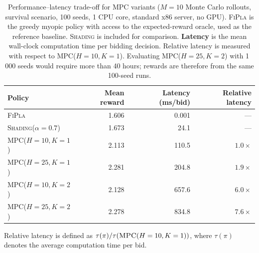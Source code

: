 \documentclass[11pt]{article}
\begin{document}
\begin{table}[H]
\centering
\caption{Performance--latency trade-off for MPC variants
         ($M{=}10$ Monte Carlo rollouts, survival scenario, 100 seeds,
         1 CPU core, standard x86 server, no GPU).
         \textsc{FiPla} is the greedy myopic policy with access to the
         expected-reward oracle, used as the reference baseline.
         \textsc{Shading} is included for comparison.
         \textbf{Latency} is the mean wall-clock computation time per bidding
         decision.
         Relative latency is measured with respect to \textsc{MPC}($H{=}10,K{=}1$).
         Evaluating \textsc{MPC}($H{=}25,K{=}2$) with 1\,000 seeds would require
         more than 40 hours; rewards are therefore from the same 100-seed runs.}

\label{tab:mpc-perf-cost}
\begin{tabular}{lrrr}
\toprule
Policy & Mean reward & Latency (ms/bid) & Relative latency \\
\midrule
\textsc{FiPla}                   & 1.606 & 0.001 & --- \\
\textsc{Shading}($\alpha=0.7$)   & 1.673 & 24.1  & --- \\
\midrule
\textsc{MPC}($H=10,K=1$)         & 2.113 & 110.5 & $1.0\times$ \\
\textsc{MPC}($H=25,K=1$)         & 2.281 & 204.8 & $1.9\times$ \\
\textsc{MPC}($H=10,K=2$)         & 2.128 & 657.6 & $6.0\times$ \\
\textsc{MPC}($H=25,K=2$)         & 2.278 & 834.8 & $7.6\times$ \\
\bottomrule
\end{tabular}

\vspace{0.4em}
{\footnotesize
Relative latency is defined as
$\tau(\pi)/\tau(\textsc{MPC}(H=10,K=1))$,
where $\tau(\pi)$ denotes the average computation time per bid.
}
\end{table}
\end{document}
